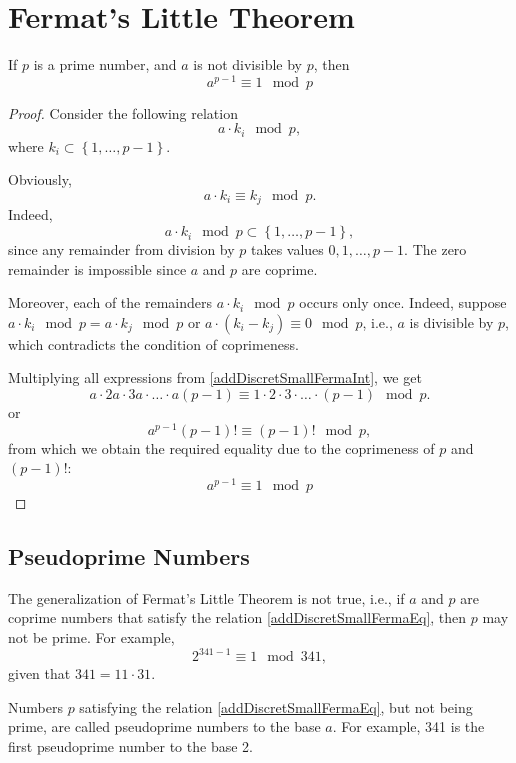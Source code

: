 \section{Fermat's Little Theorem}

\begin{theorem}
\label{addDiscretSmallFerma}
If $p$ is a prime number, and $a$ is not divisible by $p$, then 
\begin{equation}
a^{p-1} \equiv 1 \mod{p}
\label{addDiscretSmallFermaEq}
\end{equation}
\end{theorem}

\begin{proof}
Consider the following relation
\[
a \cdot k_i \mod{p},
\]
where $k_i \subset \left\{1, \dots, p - 1\right\}$.

Obviously, 
\begin{equation}
a \cdot k_i \equiv k_j \mod{p}.
\label{addDiscretSmallFermaInt}
\end{equation}
Indeed,
\[
a \cdot k_i \mod{p} \subset \left\{1, \dots, p - 1\right\},
\]
since any remainder from division by $p$ takes values $0, 1, \dots, p-1$. The zero remainder is impossible since $a$ and $p$ are coprime.

Moreover, each of the remainders $a \cdot k_i \mod{p}$ occurs only once. Indeed, suppose $a \cdot k_i \mod{p} = a\cdot k_j \mod{p}$ or $a \cdot \left( k_i - k_j \right ) \equiv 0 \mod{p}$, i.e., $a$ is divisible by $p$, which contradicts the condition of coprimeness. 

Multiplying all expressions from \autoref{addDiscretSmallFermaInt}, we get
\[
a \cdot 2a \cdot 3a \cdot \dots \cdot a\left(p - 1\right) 
\equiv 1 \cdot 2 \cdot 3 \cdot \dots \cdot \left(p - 1\right) \mod{p}.
\]
or
\[
a^{p-1} \left(p - 1\right)! \equiv \left(p - 1\right)! \mod{p},
\]
from which we obtain the required equality due to the coprimeness of $p$ and $\left(p-1\right)!$:
\[
a^{p-1} \equiv 1 \mod{p}
\]
\end{proof}

\subsection{Pseudoprime Numbers}
The generalization of Fermat's Little Theorem is not true, i.e., if $a$ and $p$ are coprime numbers that satisfy the relation \autoref{addDiscretSmallFermaEq}, then $p$ may not be prime. For example,
\[
2 ^ {341 - 1} \equiv 1 \mod{ 341 },
\] 
given that $341 = 11 \cdot 31$.

Numbers $p$ satisfying the relation \autoref{addDiscretSmallFermaEq}, but not being prime, are called pseudoprime numbers to the base $a$. For example, 341 is the first pseudoprime number to the base 2.